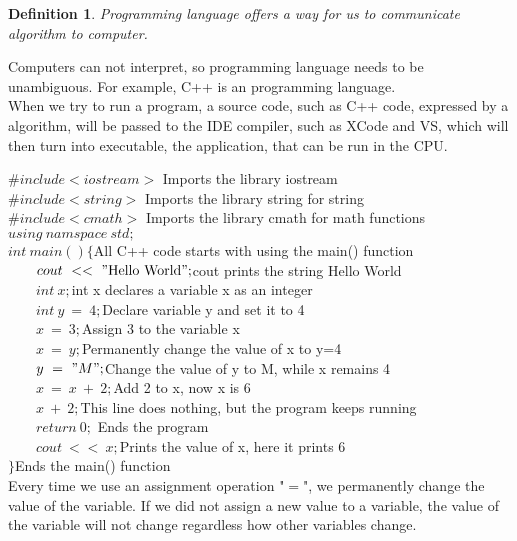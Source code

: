 \documentclass[11pt]{article}
\theoremstyle{break}
\theoremstyle{break}
\newtheorem{defn}{Definition}[corL]
\begin{document}
\begin{defn}
Programming language offers a way for us to communicate algorithm to computer.
\end{defn}
Computers can not interpret, so programming language needs to be unambiguous. For example, C++ is an programming language.\\

When we try to run a program, a source code, such as C++ code, expressed by a algorithm, will be passed to the IDE compiler, such as XCode and VS, which will then turn into executable, the application, that can be run in the CPU.\\
\newpage

$\#include <iostream>$ \hfill Imports the library iostream\\
$\#include <string>$ \hfill Imports the library string for string\\
$\#include <cmath>$ \hfill Imports the library cmath for math functions\\
$using\ namspace\ std;$ \hfill \\
\hfill\break
$int\ main()\{$\hfill All C++ code starts with using the main() function\\
${}\qquad cout\ <<\ "\text{Hello World}";$\hfill cout prints the string Hello World\\
${}\qquad int\ x;$\hfill int x declares a variable x as an integer\\
${}\qquad int\ y\ =\ 4;$\hfill Declare variable y and set it to 4\\
${}\qquad x\ =\ 3;$\hfill Assign 3 to the variable x\\
${}\qquad x\ =\ y;$\hfill Permanently change the value of x to y=4\\
${}\qquad y\ =\ "M";$\hfill Change the value of y to M, while x remains 4\\
${}\qquad x\ =\ x\ +\ 2;$\hfill Add 2 to x, now x is 6\\
${}\qquad x\ +\ 2;$\hfill This line does nothing, but the program keeps running\\
${}\qquad return\ 0;$ \hfill Ends the program\\
${}\qquad cout\ <<\ x;$\hfill Prints the value of x, here it prints 6\\
$\}$\hfill Ends the main() function\\

\hfill\break
Every time we use an assignment operation "$=$", we permanently change the value of the variable. If we did not assign a new value to a variable, the value of the variable will not change regardless how other variables change.\\
\end{document}
